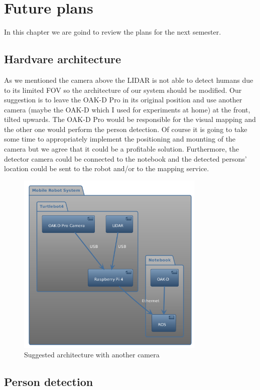 \chapter{Future plans} \label{future_plans}

In this chapter we are goind to review the plans for the next semester.

\section{Hardvare architecture}

As we mentioned the camera above the LIDAR is not able to detect humans due to its limited FOV so the architecture of our system should be modified. Our suggestion is to leave the OAK-D Pro in its original position and use another camera (maybe the OAK-D which I used for experiments at home) at the front, tilted upwards. The OAK-D Pro would be responsible for the visual mapping and the other one would perform the person detection. Of course it is going to take some time to appropriately implement the positioning and mounting of the camera but we agree that it could be a profitable solution. Furthermore, the detector camera could be connected to the notebook and the detected persons' location could be sent to the robot and/or to the mapping service.

\begin{figure}[H]
    \centering
    \includegraphics[width=90mm, keepaspectratio]{figures/suggested_architecture.png}
    \caption{Suggested architecture with another camera}
    \label{fig:suggested_architecture}
\end{figure}

\section{Person detection}

